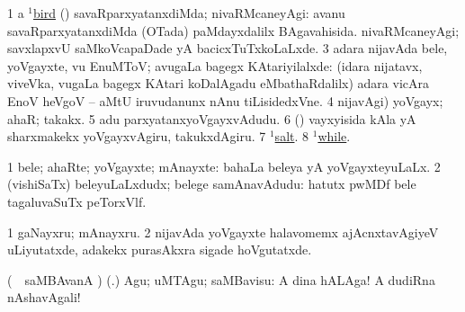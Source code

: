 \begin{center}
\bentry
{}
\gl{\gu}
\enum
\emng

\noindent
\gl{\pagu}
\expl{}
\bmng
\bnum
\num{1} a \hyperref{kandict_b.pdf}{B}{bird(1) nuga(1)}{$^1$bird}  
  (\AmA) 
\banum
{} savaRparxyatanxdiMda; nivaRMcaneyAgi:  avanu savaRparxyatanxdiMda (OTada) paMdayxdalilx BAgavahisida. 
 nivaRMcaneyAgi; savxlapxvU saMkoVcapaDade yA bacicxTuTxkoLaLxde. 
\eanum
\numie
\num{3}  adara nijavAda bele, yoVgayxte, \mo vu EnuMToV; avugaLa bagegx KAtariyilalxde:  (idara nijatavx, viveVka, \mo vugaLa bagegx KAtari koDalAgadu eMbathaRdalilx) adara vicAra EnoV heVgoV -- aMtU iruvudanunx nAnu tiLisidedxVne. 
\num{4}  nijavAgi) yoVgayx; ahaR; takakx. 
\num{5}  adu parxyatanxyoVgayxvAdudu. 
\num{6}  (\AmA) vayxyisida kAla yA sharxmakekx yoVgayxvAgiru, takukxdAgiru. 
\num{7}  \hyperref{kandict_s.pdf}{S}{salt(1) pagu(20)}{$^1$salt}. 
\num{8}  \hyperlink{while(1) pagu(9)}{$^1$while}. 
\enum
\emng
\eentry

\bentry
{}
\gl{\nA}
\expl{}
\bmng
\bnum
\num{1} bele; ahaRte; yoVgayxte; mAnayxte:  bahaLa beleya yA yoVgayxteyuLaLx. 
\num{2} (vishiSaTx) beleyuLaLxdudx; belege samAnavAdudu:  hatutx pwMDf bele tagaluvaSuTx peTorxVlf. 
\enum
\emng

\noindent
\gl{\pagu}
\expl{}
\bmng
\bnum
\num{1}  gaNayxru; mAnayxru. 
\num{2}  nijavAda yoVgayxte halavomemx ajAcnxtavAgiyeV uLiyutatxde, adakekx purasAkxra sigade hoVgutatxde. 
\enum
\emng
\eentry

\bentry
{}
\gl{\sakirx}
\expl{}
\bmng
(\parxpu\ \Eva\ saMBAvanA \rUpa) (\pArxparx.) Agu; uMTAgu; saMBavisu:  A dina hALAga! A dudiRna nAshavAgali! \mo 
\emng
\eentry


\end{center}
